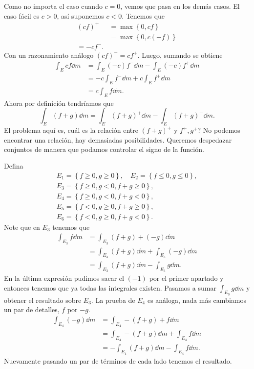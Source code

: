 \documentclass[12pt]{article}
\theoremstyle{plain}
\theoremstyle{definition}
\theoremstyle{remark}
\numberwithin{equation}{section}
\renewcommand{\geq}{\geqslant}      %
\renewcommand{\leq}{\leqslant}      %
\renewcommand{\:}{\colon}           %
\newcommand{\conj}[1]{\left\lbrace#1\right\rbrace}
\begin{document}
\begin{multicols}{2}
\begin{ptcbp}
Como no importa el caso cuando $c=0$, vemos que pasa en los demás casos. El caso fácil es $c>0$, así suponemos $c<0$. Tenemos que
\begin{align*}
  (cf)^+ &=\max\conj{0,cf}\\
  &=\max\conj{0,c(-f)}\\
  =-cf^-.
\end{align*}
Con un razonamiento análogo $(cf)^-=cf^+$. Luego, sumando se obtiene
\begin{align*}
  \int_Ecf\dd m &=\int_E(-c)f^-\dd m-\int_E(-c)f^+\dd m\\
  &=-c\int_Ef^-\dd m+c\int_Ef^+\dd m\\
  &=c\int_Ef\dd m.
\end{align*}
Ahora por definición tendríamos que
$$\int_E(f+g)\dd m=\int_E(f+g)^+\dd m-\int_E(f+g)^-\dd m.$$
El problema aquí es, cuál es la relación entre $(f+g)^+$ y $f^+, g^+$? No podemos encontrar una relación, hay demasiadas posibilidades. Queremos despedazar conjuntos de manera que podamos controlar el signo de la función.\par
Defina
\begin{gather*}
  E_1=\conj{f\geq 0,g\geq 0},\quad E_2=\conj{f\leq 0,g\leq 0},\\
  E_3=\conj{f\geq 0,g<0, f+g\geq 0}, \\
  E_4=\conj{f\geq 0,g<0, f+g< 0},\\
  E_5=\conj{f< 0,g\geq 0, f+g\geq 0},\\
  E_6=\conj{f< 0,g\geq 0, f+g< 0}.
\end{gather*}
Note que en $E_3$ tenemos que
\begin{align*}
  \int_{E_3}f\dd m &=\int_{E_3}(f+g)+(-g)\dd m\\
   &=\int_{E_3}(f+g)\dd m+ \int_{E_3}(-g)\dd m\\
   &=\int_{E_3}(f+g)\dd m- \int_{E_3}g\dd m.
\end{align*}
En la última expresión pudimos sacar el $(-1)$ por el primer apartado y entonces tenemos que ya todas las integrales existen. Pasamos a sumar $\int_{E_3}g\dd m$ y obtener el resultado sobre $E_3$. La prueba de $E_4$ es análoga, nada más cambiamos un par de detalles, $f$ por $-g$.
\begin{align*}
  \int_{E_4}(-g)\dd m &=\int_{E_4}-(f+g)+f\dd m\\
   &=\int_{E_4}-(f+g)\dd m+ \int_{E_4}f\dd m\\
   &=-\int_{E_4}(f+g)\dd m- \int_{E_4}f\dd m.
\end{align*}
Nuevamente pasando un par de términos de cada lado tenemos el resultado.
\end{ptcbp}


\end{multicols}
\end{document}
